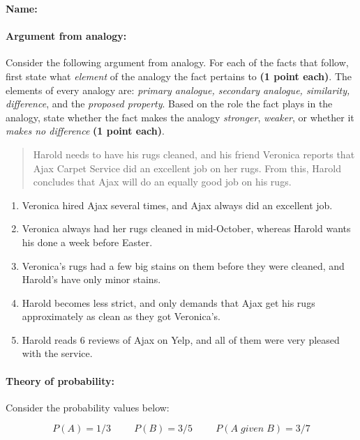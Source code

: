 \documentclass[10pt]{article}
\begin{document}
\textbf{Name:}\underline{\hspace{2in}}

\paragraph{Argument from analogy:} Consider the following argument from analogy.  For each of the facts that follow, first state what \textit{element} of the analogy the fact pertains to \textbf{(1 point each)}. The elements of every analogy are: \textit{primary analogue, secondary analogue, similarity, difference}, and the \textit{proposed property}. Based on the role the fact plays in the analogy, state whether the fact makes the analogy \textit{stronger}, \textit{weaker}, or whether it \textit{makes no difference} \textbf{(1 point each)}.

\begin{quote}
 Harold needs to have his rugs cleaned, and his friend Veronica reports that Ajax Carpet Service did an excellent job on her rugs. From this, Harold concludes that Ajax will do an equally good job on his rugs.
\end{quote}

\begin{enumerate}

\item Veronica hired Ajax several times, and Ajax always did an excellent job.
\item Veronica always had her rugs cleaned in mid-October, whereas Harold wants his done a week before Easter.
\item Veronica's rugs had a few big stains on them before they were cleaned, and Harold's have only minor stains.
\item Harold becomes less strict, and only demands that Ajax get his rugs approximately as clean as they got Veronica's.
\item Harold reads 6 reviews of Ajax on Yelp, and all of them were very pleased with the service.

\end{enumerate}

\vspace{5cm}

\paragraph{Theory of probability:} Consider the probability values below:

\[P(A) = 1/3 \hspace{1cm} P(B) = 3/5 \hspace{1cm} P(A\; given\; B) = 3/7\]
\end{document}
